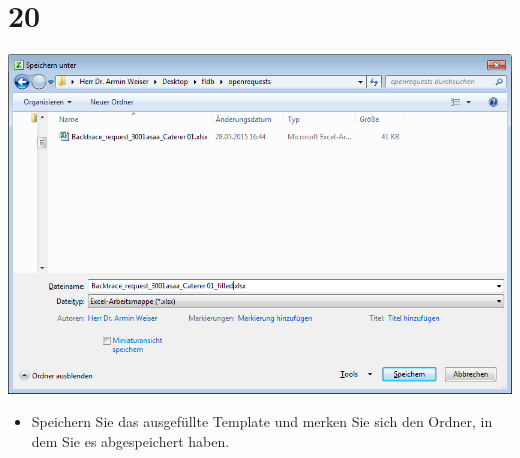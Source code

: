 \documentclass{beamer}
\begin{document}
\section{20}
\begin{frame}
	\begin{center}
  		\includegraphics[height=0.6\textheight]{20.png}
	\end{center}
	\begin{itemize}
		\item Speichern Sie das ausgefüllte Template und merken Sie sich den Ordner, in dem Sie es abgespeichert haben.
	\end{itemize}
\end{frame}
\end{document}

